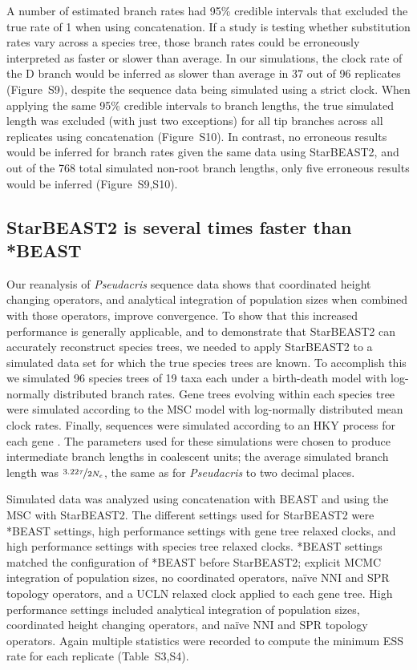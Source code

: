 \documentclass[nogrid]{MBE}%
\begin{document}
A number of estimated branch rates had 95\% credible intervals that excluded the
true rate of 1 when using concatenation. If a study is testing whether
substitution rates vary across a species tree, those branch rates could be
erroneously interpreted as faster or slower than average. In our simulations,
the clock rate of the D branch would be inferred as slower than average in 37
out of 96 replicates (Figure~S9), despite the sequence data being simulated
using a strict clock. When applying the same 95\% credible intervals to branch
lengths, the true simulated length was excluded (with just two exceptions) for
all tip branches across all replicates using concatenation (Figure~S10). In
contrast, no erroneous results would be inferred for branch rates given the same
data using StarBEAST2, and out of the 768 total simulated non-root branch
lengths, only five erroneous results would be inferred (Figure~S9,S10).

\subsection{StarBEAST2 is several times faster than *BEAST}

Our reanalysis of \textit{Pseudacris} sequence data shows that coordinated height changing operators,
and analytical integration of population sizes when combined with those operators,
improve convergence. To show that this increased performance is generally
applicable, and to demonstrate that StarBEAST2 can accurately reconstruct
species trees, we needed to apply StarBEAST2 to a simulated data set for
which the true species trees are known. To accomplish this we simulated 96 species
trees of 19 taxa each under a birth-death model with log-normally distributed
branch rates. Gene trees evolving within each species tree were simulated
according to the MSC model with log-normally distributed mean clock rates.
Finally, sequences were simulated according to an HKY process for each gene
\citep{Hasegawa1985, Goldman1993}. The parameters used for these simulations
were chosen to produce intermediate branch lengths in coalescent units; the
average simulated branch length was $\nicefrac{3.22\tau}{2N_e}$, the same as for
\textit{Pseudacris} to two decimal places.

Simulated data was analyzed using concatenation with BEAST and using the MSC with
StarBEAST2. The different settings used for StarBEAST2 were *BEAST settings,
high performance settings with gene tree relaxed clocks, and high performance settings with
species tree relaxed clocks. *BEAST settings matched the configuration of *BEAST
before StarBEAST2; explicit MCMC integration of population sizes, no
coordinated operators, na\"ive NNI and SPR topology operators, and a UCLN
relaxed clock applied to each gene tree. High performance settings included analytical
integration of population sizes, coordinated height changing operators, and
na\"ive NNI and SPR topology operators. Again multiple statistics were recorded
to compute the minimum ESS rate for each replicate (Table~S3,S4).
\end{document}
